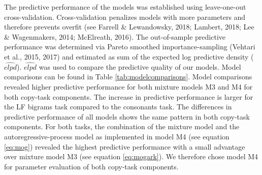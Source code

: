 \documentclass[
  english,
  man,mask,floatsintext]{apa7}
\begin{document}
The predictive performance of the models was established using leave-one-out cross-validation. Cross-validation penalizes models with more parameters and therefore prevents overfit (see Farrell \& Lewandowsky, 2018; Lambert, 2018; Lee \& Wagenmakers, 2014; McElreath, 2016). The out-of-sample predictive performance was determined via Pareto smoothed importance-sampling (Vehtari et al., 2015, 2017) and estimated as sum of the expected log predictive density (\(\widehat{elpd}\)). \(\widehat{elpd}\) was used to compare the predictive quality of our models. Model comparisons can be found in Table \ref{tab:modelcomparisons}. Model comparisons revealed higher predictive performance for both mixture models M3 and M4 for both copy-task components. The increase in predictive performance is larger for the LF bigrams task compared to the consonants task. The differences in predictive performance of all models shows the same pattern in both copy-task components. For both tasks, the combination of the mixture model and the autoregressive-process model as implemented in model M4 (see equation \ref{eq:mog}) revealed the highest predictive performance with a small advantage over mixture model M3 (see equation \ref{eq:mogark}). We therefore chose model M4 for parameter evaluation of both copy-task components.
\end{document}
